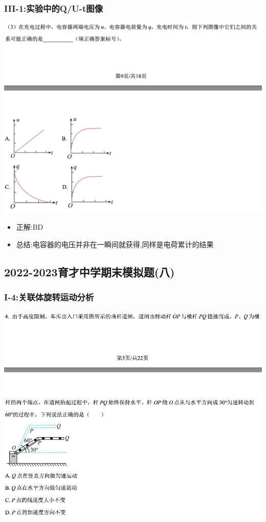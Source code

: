 \documentclass{article}
\begin{document}
\subsubsection{III-1:实验中的Q/U-t图像}
\includegraphics[width=50em,keepaspectratio]{./pictures/1.1-4.png}

\begin{itemize}
    \item 正解:\quad BD
    \item 总结:\quad 电容器的电压并非在一瞬间就获得,同样是电荷累计的结果
\end{itemize}

\vspace{2em}

\subsection{2022-2023育才中学期末模拟题(八)}

\subsubsection{I-4:关联体旋转运动分析}
\includegraphics[width=50em,keepaspectratio]{./pictures/1.2-1.png}
\end{document}
